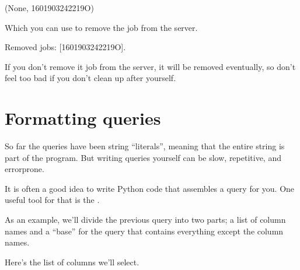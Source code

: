 \documentclass[letterpaper,10pt,english]{sphinxmanual}
\begin{document}
\begin{sphinxVerbatim}[commandchars=\\\{\}]
(None, \PYGZsq{}1601903242219O\PYGZsq{})
\end{sphinxVerbatim}

Which you can use to remove the job from the server.

\begin{sphinxVerbatim}[commandchars=\\\{\}]
\PYG{p}{[}\PYG{p}{]}
\end{sphinxVerbatim}

\begin{sphinxVerbatim}[commandchars=\\\{\}]
Removed jobs: \PYGZsq{}[\PYGZsq{}1601903242219O\PYGZsq{}]\PYGZsq{}.
\end{sphinxVerbatim}

If you don’t remove it job from the server, it will be removed eventually, so don’t feel too bad if you don’t clean up after yourself.


\section{Formatting queries}
\label{\detokenize{01_query:formatting-queries}}
So far the queries have been string “literals”, meaning that the entire string is part of the program.
But writing queries yourself can be slow, repetitive, and error\sphinxhyphen{}prone.

It is often a good idea to write Python code that assembles a query for you.  One useful tool for that is the .

As an example, we’ll divide the previous query into two parts; a list of column names and a “base” for the query that contains everything except the column names.

Here’s the list of columns we’ll select.

\begin{sphinxVerbatim}[commandchars=\\\{\}]
  
\end{sphinxVerbatim}
\end{document}
